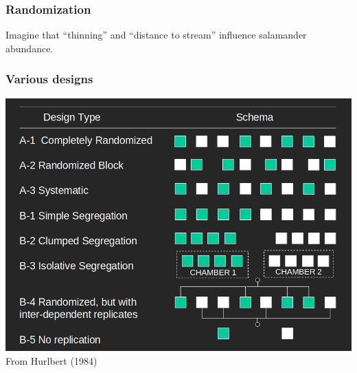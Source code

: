\documentclass[color=usenames,dvipsnames]{beamer}\usepackage[]{graphicx}\usepackage[]{color}
\begin{document}
\begin{frame}
  \frametitle{Randomization}
  Imagine that ``thinning'' and ``distance to stream'' influence
  salamander abundance.
  \begin{center}
 \end{center}
\end{frame}




\begin{frame}
  \frametitle{Various designs}
  \includegraphics[width=\textwidth]{Hurlbert-schema} \\
  \centering
  From Hurlbert (1984) \\
\end{frame}
\end{document}
